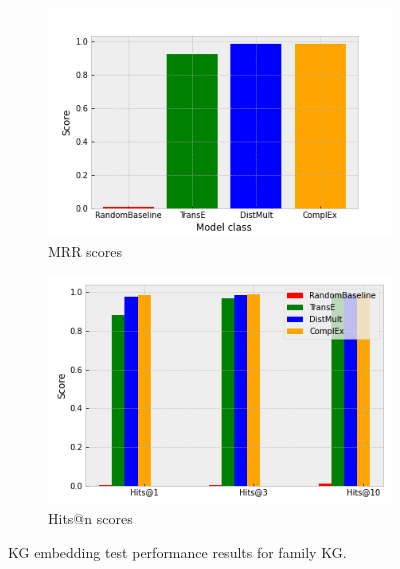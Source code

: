 \begin{figure}[htbp]
\centering
\begin{subfigure}{.5\textwidth}
  \centering
  \includegraphics[width=1\linewidth]{figures/model_selection/family_mrr.png}
  \caption{MRR scores}
  \label{fig:model_selection_mrr_family}
\end{subfigure}%
\begin{subfigure}{.5\textwidth}
  \centering
  \includegraphics[width=1\linewidth]{figures/model_selection/family_hit_scores.png}
  \caption{Hits@n scores}
  \label{fig:model_selection_hit_scores_family}
\end{subfigure}
\caption[KG embedding test  results for family KG.]{KG embedding test performance results for family KG.}
\label{fig:model_selection_metrics_family}
\end{figure}

